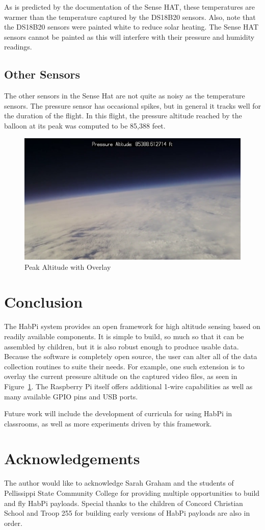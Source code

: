 \documentclass[journal]{new-aiaa}
\begin{document}
As is predicted by the documentation of the Sense HAT, these
temperatures are warmer than the temperature captured by the DS18B20
sensors.  Also, note that the DS18B20 sensors were painted white to
reduce solar heating.  The Sense HAT sensors cannot be painted as this
will interfere with their pressure and humidity readings.

\subsection{Other Sensors}
The other sensors in the Sense Hat are not quite as noisy as the
temperature sensors.  The pressure sensor has occasional spikes, but
in general it tracks well for the duration of the flight.  In this
flight, the pressure altitude reached by the balloon at its peak was
computed to be 85,388 feet.  

\begin{figure}
    \centering
    \includegraphics[width=0.75\linewidth]{images/peak-altitude}
    \caption{Peak Altitude with Overlay}
    \label{fig:peak}
\end{figure}

\section{Conclusion}
The HabPi system provides an open framework for high altitude sensing
based on readily available components.  It is simple to build, so much
so that it can be assembled by children, but it is also robust enough
to produce usable data.  Because the software is completely open
source, the user can alter all of the data collection routines to
suite their needs.  For example, one such extension is to overlay the
current pressure altitude on the captured video files, as seen in
Figure~\ref{fig:peak}.  The Raspberry Pi itself offers additional
1-wire capabilities as well as many available GPIO pins and USB ports.  

Future work will include the development of curricula for using HabPi
in classrooms, as well as more experiments driven by this framework.

\section{Acknowledgements}
The author would like to acknowledge Sarah Graham and the students of
Pellissippi State Community College for providing multiple
opportunities to build and fly HabPi payloads.  Special thanks to the
children of Concord Christian School and Troop 255 for building early
versions of HabPi payloads are also in order.


\end{document}
